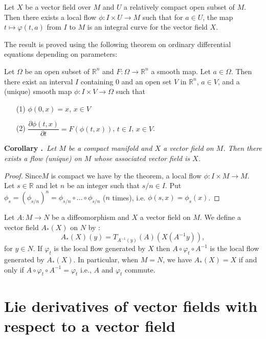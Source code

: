 \begin{theorem}\label{chap6-thm6.2}
Let $X$ be a vector field over $M$ and $U$ a relatively compact open subset of $M$. Then there exists a local flow $\phi:I\times U\to M$ such that for $a\in U$, the map $t\mapsto \varphi(t,a)$ from $I$ to $M$ is an integral curve for the vector field $X$.
\end{theorem}

The result is proved using the following theorem on ordinary differential equations depending on parameters:

Let $\Omega$ be an open subset of $\mathbb{R}^{n}$ and $F:\Omega\to \mathbb{R}^{n}$ a smooth map. Let $a\in \Omega$. Then there exist an interval $I$ containing $0$ and an open set $V$ in $\mathbb{R}^{n}$, $a\in V$, and a (unique) smooth map $\phi:I\times V\to \Omega$ such that
\begin{itemize}
\item[(1)] $\phi(0,x)=x$, $x\in V$

\item[(2)] $\dfrac{\partial \phi(t,x)}{\partial t}=F(\phi(t,x))$, $t\in I$, $x\in V$.
\end{itemize}

\noindent
{\bf Corollary .\label{chap6-coro6.2.1}}~{\em Let $M$ be a compact manifold and $X$ a vector field on $M$. Then there exists a flow (unique) on $M$ whose associated vector field is $X$.}

\begin{proof}
Since\pageoriginale $M$ is compact we have by the theorem, a local flow $\phi:I\times M\to M$. Let $s\in \mathbb{R}$ and let $n$ be an integer such that $s/n\in I$. Put $\phi_{s}=(\phi_{s/n})^{n}=\phi_{s/n}\circ\ldots\circ \phi_{s/n}$ ($n$ times), i.e. $\phi(s,x)=\phi_{s}(x)$.
\end{proof}

\begin{remark}\label{chap6-rem6.3}
Let $A:M\to N$ be a diffeomorphism and $X$ a vector field on $M$. We define a vector field $A_{*}(X)$ on $N$ by : 
$$
A_{*}(X)(y)=T_{A^{-1}(y)}(A)(X(A^{-1}y)),
$$
for $y\in N$. If $\varphi_{t}$ is the local flow generated by $X$ then $A\circ \varphi_{t}\circ A^{-1}$ is the local flow generated by $A_{*}(X)$. In particular, when $M=N$, we have $A_{*}(X)=X$ if and only if $A\circ \varphi_{t}\circ A^{-1}=\varphi_{t}$ i.e., $A$ and $\varphi_{t}$ commute. 
\end{remark}

\section*{Lie derivatives of vector fields with respect to a vector field}

